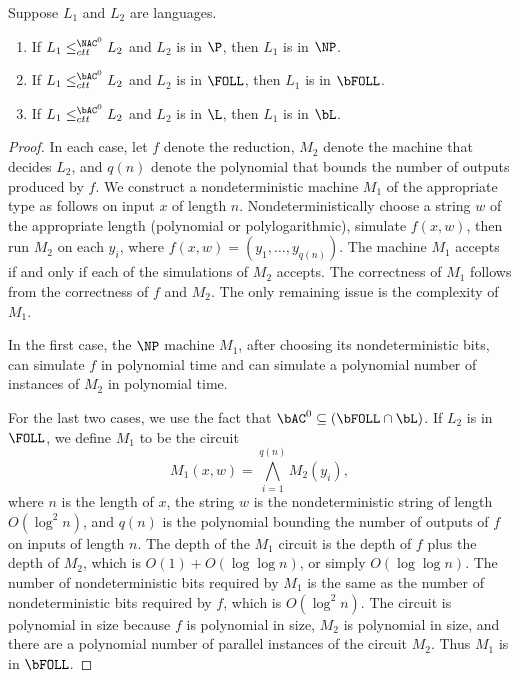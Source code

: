 \documentclass{article}
\begin{document}
\begin{lemma}\label{lem:ctt}
  Suppose $L_1$ and $L_2$ are languages.
  \begin{enumerate}
  \item If $L_1 \leq^{\NAC^0}_{ctt} L_2$ and $L_2$ is in $\P$, then $L_1$ is in $\NP$.
  \item If $L_1 \leq^{\bAC^0}_{ctt} L_2$ and $L_2$ is in $\FOLL$, then $L_1$ is in $\bFOLL$.
  \item If $L_1 \leq^{\bAC^0}_{ctt} L_2$ and $L_2$ is in $\L$, then $L_1$ is in $\bL$.
  \end{enumerate}
\end{lemma}
\begin{proof}
  In each case, let $f$ denote the reduction, $M_2$ denote the machine that decides $L_2$, and $q(n)$ denote the polynomial that bounds the number of outputs produced by $f$.
  We construct a nondeterministic machine $M_1$ of the appropriate type as follows on input $x$ of length $n$.
  Nondeterministically choose a string $w$ of the appropriate length (polynomial or polylogarithmic), simulate $f(x, w)$, then run $M_2$ on each $y_i$, where $f(x, w) = (y_1, \dotsc, y_{q(n)})$.
  The machine $M_1$ accepts if and only if each of the simulations of $M_2$ accepts.
  The correctness of $M_1$ follows from the correctness of $f$ and $M_2$.
  The only remaining issue is the complexity of $M_1$.

  In the first case, the $\NP$ machine $M_1$, after choosing its nondeterministic bits, can simulate $f$ in polynomial time and can simulate a polynomial number of instances of $M_2$ in polynomial time.

  For the last two cases, we use the fact that $\bAC^0 \subseteq (\bFOLL \cap \bL)$.
  If $L_2$ is in $\FOLL$, we define $M_1$ to be the circuit
  \begin{equation*}
    M_1(x, w) = \bigwedge_{i = 1}^{q(n)} M_2(y_i),
  \end{equation*}
  where $n$ is the length of $x$, the string $w$ is the nondeterministic string of length $O(\log^2 n)$, and $q(n)$ is the polynomial bounding the number of outputs of $f$ on inputs of length $n$.
  The depth of the $M_1$ circuit is the depth of $f$ plus the depth of $M_2$, which is $O(1) + O(\log \log n)$, or simply $O(\log \log n)$.
  The number of nondeterministic bits required by $M_1$ is the same as the number of nondeterministic bits required by $f$, which is $O(\log^2 n)$.
  The circuit is polynomial in size because $f$ is polynomial in size, $M_2$ is polynomial in size, and there are a polynomial number of parallel instances of the circuit $M_2$.
  Thus $M_1$ is in $\bFOLL$.


\end{proof}
\end{document}
